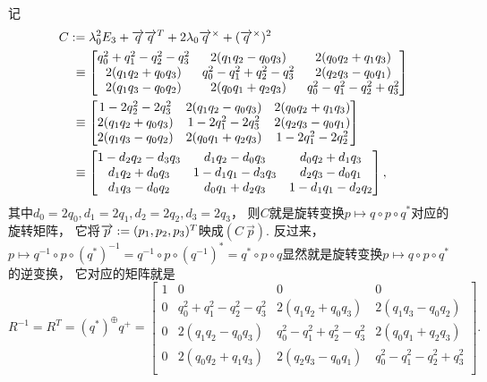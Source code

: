 记\begin{align*}
	C &:= \lambda_0^2 E_3 + \overrightarrow{q} \overrightarrow{q}^T + 2 \lambda_0 \overrightarrow{q}^\times + (\overrightarrow{q}^\times)^2 \\
	&\hspace{3pt}\equiv \begin{bmatrix}
		q_0^2 + q_1^2 - q_2^2 - q_3^2 & 2 (q_1 q_2 - q_0 q_3) & 2 (q_0 q_2 + q_1 q_3) \\
		2 (q_1 q_2 + q_0 q_3) & q_0^2 - q_1^2 + q_2^2 - q_3^2 & 2 (q_2 q_3 - q_0 q_1) \\
		2 (q_1 q_3 - q_0 q_2) & 2 (q_0 q_1 + q_2 q_3) & q_0^2 - q_1^2 - q_2^2 + q_3^2 \\
	\end{bmatrix} \\
	&\hspace{3pt}\equiv \begin{bmatrix}
		1 - 2 q_2^2 - 2 q_3^2 & 2 (q_1 q_2 - q_0 q_3) & 2 (q_0 q_2 + q_1 q_3) \\
		2 (q_1 q_2 + q_0 q_3) & 1 - 2 q_1^2 - 2 q_3^2 & 2 (q_2 q_3 - q_0 q_1) \\
		2 (q_1 q_3 - q_0 q_2) & 2 (q_0 q_1 + q_2 q_3) & 1 - 2 q_1^2 - 2 q_2^2 \\
	\end{bmatrix} \\
	&\hspace{3pt}\equiv \begin{bmatrix}
		1 - d_2 q_2 - d_3 q_3 & d_1 q_2 - d_0 q_3 & d_0 q_2 + d_1 q_3 \\
		d_1 q_2 + d_0 q_3 & 1 - d_1 q_1 - d_3 q_3 & d_2 q_3 - d_0 q_1 \\
		d_1 q_3 - d_0 q_2 & d_0 q_1 + d_2 q_3 & 1 - d_1 q_1 - d_2 q_2 \\
	\end{bmatrix},
\end{align*}
其中\(
	d_0 = 2 q_0,
	d_1 = 2 q_1,
	d_2 = 2 q_2,
	d_3 = 2 q_3
\)，
则\(C\)就是旋转变换\(p \mapsto q \circ p \circ q^*\)对应的旋转矩阵，
它将\(\overrightarrow{p} := (p_1,p_2,p_3)^T\)映成\(\left( C ~ \vec{p} \right)\).
反过来，
\(
	p
	\mapsto
	q^{-1} \circ p \circ (q^*)^{-1}
	= q^{-1} \circ p \circ (q^{-1})^*
	= q^* \circ p \circ q
\)显然就是旋转变换\(p \mapsto q \circ p \circ q^*\)的逆变换，
它对应的矩阵就是\begin{equation*}
	R^{-1}
	= R^T
	= (q^*)^\oplus q^+
	= \begin{bmatrix}
		1 & 0 & 0 & 0 \\
		0 & q_0^2+q_1^2-q_2^2-q_3^2 & 2 (q_1 q_2+q_0 q_3) & 2 (q_1 q_3 - q_0 q_2) \\
		0 & 2 (q_1 q_2-q_0 q_3) & q_0^2-q_1^2+q_2^2-q_3^2 & 2 (q_0 q_1+q_2 q_3) \\
		0 & 2 (q_0 q_2+q_1 q_3) & 2 (q_2 q_3 - q_0 q_1) & q_0^2-q_1^2-q_2^2+q_3^2 \\
	\end{bmatrix}.
\end{equation*}


